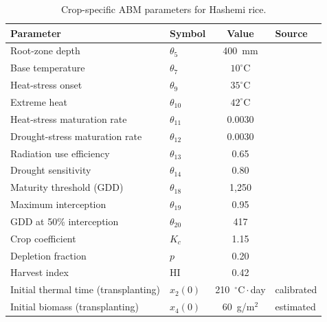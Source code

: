 \begin{table}[h]
\centering
\caption{Crop-specific ABM parameters for Hashemi rice.}
\label{tab:crop-params}
\begin{tabular}{llcl}
\toprule
\textbf{Parameter} & \textbf{Symbol} & \textbf{Value} & \textbf{Source} \\
\midrule
Root-zone depth                       & $\theta_5$         & 400~mm                         & \cite{allen1998} \\
Base temperature                      & $\theta_7$         & $10^{\circ}$C                  & \cite{mcmaster1997} \\
Heat-stress onset                     & $\theta_9$         & $35^{\circ}$C                  & \cite{allen1998} \\
Extreme heat                          & $\theta_{10}$      & $42^{\circ}$C                  & \cite{laohasiriwong2023} \\
Heat-stress maturation rate           & $\theta_{11}$      & 0.0030                         & \cite{Lopezjimenez2024} \\
Drought-stress maturation rate        & $\theta_{12}$      & 0.0030                         & \cite{Lopezjimenez2024} \\
Radiation use efficiency              & $\theta_{13}$      & 0.65                           & \cite{patel2013,sadras2021} \\
Drought sensitivity                   & $\theta_{14}$      & 0.80                           & \cite{Lopezjimenez2024} \\
Maturity threshold (GDD)              & $\theta_{18}$      & 1{,}250                        & \cite{sadidi2021} \\
Maximum interception                  & $\theta_{19}$      & 0.95                           & \cite{Lopezjimenez2024} \\
GDD at 50\% interception              & $\theta_{20}$      & 417                            & \cite{paredes2025} \\
Crop coefficient                      & $K_c$              & 1.15                           & \cite{allen1998,jalali2021} \\
Depletion fraction                    & $p$                & 0.20                           & \cite{allen1998} \\
Harvest index                         & $\mathrm{HI}$      & 0.42                           & \cite{jalali2021} \\
Initial thermal time (transplanting)  & $x_2(0)$           & 210~$^{\circ}\mathrm{C}\cdot$day  & calibrated \\
Initial biomass (transplanting)       & $x_4(0)$           & 60~g/m$^2$                     & estimated \\
\bottomrule
\end{tabular}
\end{table}

